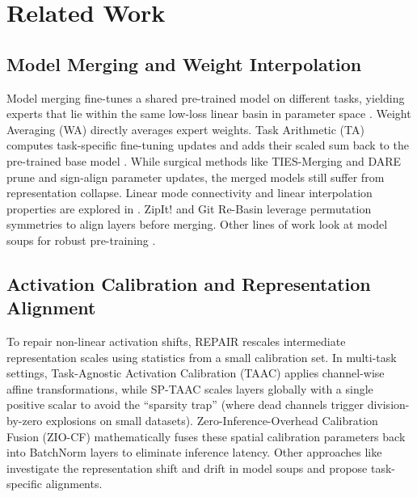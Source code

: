 \documentclass{article}
\begin{document}
\section{Related Work}
\label{sec:related}

\subsection{Model Merging and Weight Interpolation}
Model merging fine-tunes a shared pre-trained model on different tasks, yielding experts that lie within the same low-loss linear basin in parameter space \cite{izmailov18, wortsman22, garipov2018loss, draxler2018essentially}. Weight Averaging (WA) directly averages expert weights. Task Arithmetic (TA) computes task-specific fine-tuning updates and adds their scaled sum back to the pre-trained base model \cite{ilharco22}. While surgical methods like TIES-Merging \cite{yadav23} and DARE \cite{yu24} prune and sign-align parameter updates, the merged models still suffer from representation collapse. Linear mode connectivity and linear interpolation properties are explored in \cite{frankle2020linear, entezari2021role, caccia2021linear}. ZipIt! \cite{stoica2023zipit} and Git Re-Basin \cite{ainsworth2022git} leverage permutation symmetries to align layers before merging. Other lines of work look at model soups for robust pre-training \cite{wortsman22}.

\subsection{Activation Calibration and Representation Alignment}
To repair non-linear activation shifts, REPAIR \cite{jordan22} rescales intermediate representation scales using statistics from a small calibration set. In multi-task settings, Task-Agnostic Activation Calibration (TAAC) \cite{anon2026b} applies channel-wise affine transformations, while SP-TAAC \cite{agent2026} scales layers globally with a single positive scalar to avoid the ``sparsity trap'' (where dead channels trigger division-by-zero explosions on small datasets). Zero-Inference-Overhead Calibration Fusion (ZIO-CF) \cite{pragmatist2026} mathematically fuses these spatial calibration parameters back into BatchNorm layers to eliminate inference latency. Other approaches like \cite{zhao2023calibrating, wang2024task, zhang2024analyzing, li2023representational, tang2023merging} investigate the representation shift and drift in model soups and propose task-specific alignments.
\end{document}
